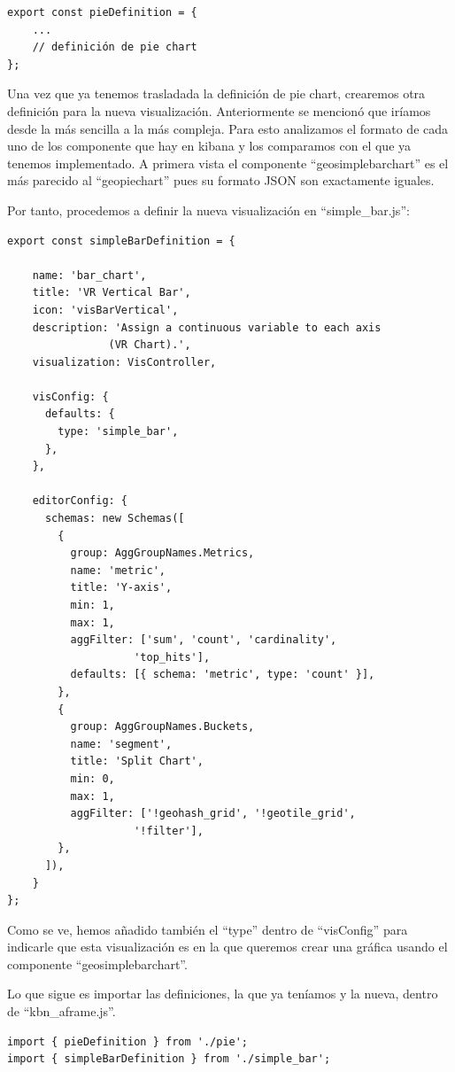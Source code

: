 \documentclass[a4paper, 12pt]{book}
\begin{document}
\begin{lstlisting}[frame=single]
export const pieDefinition = { 
    ...
    // definición de pie chart
};
\end{lstlisting}

Una vez que ya tenemos trasladada la definición de pie chart, crearemos otra definición para la nueva visualización. Anteriormente se mencionó que iríamos desde la más sencilla a la más compleja. Para esto analizamos el formato de cada uno de los componente que hay en kibana y los comparamos con el que ya tenemos implementado. A primera vista el componente “geosimplebarchart” es el más parecido al “geopiechart” pues su formato JSON son exactamente iguales.

Por tanto, procedemos a definir la nueva visualización en “simple\_bar.js”:

\begin{lstlisting}[frame=single]
export const simpleBarDefinition = {
    
    name: 'bar_chart',
    title: 'VR Vertical Bar',
    icon: 'visBarVertical',
    description: 'Assign a continuous variable to each axis 
                (VR Chart).',
    visualization: VisController,
    
    visConfig: {
      defaults: {
        type: 'simple_bar',
      },
    },
    
    editorConfig: {
      schemas: new Schemas([
        {
          group: AggGroupNames.Metrics,
          name: 'metric',
          title: 'Y-axis',
          min: 1,
          max: 1,
          aggFilter: ['sum', 'count', 'cardinality',
                    'top_hits'],
          defaults: [{ schema: 'metric', type: 'count' }],
        },
        {
          group: AggGroupNames.Buckets,
          name: 'segment',
          title: 'Split Chart',
          min: 0,
          max: 1,
          aggFilter: ['!geohash_grid', '!geotile_grid', 
                    '!filter'],
        },
      ]),
    }
};
\end{lstlisting}

Como se ve, hemos añadido también el “type” dentro de “visConfig” para indicarle que esta visualización es en la que queremos crear una gráfica usando el componente “geosimplebarchart”.

Lo que sigue es importar las definiciones, la que ya teníamos y la nueva, dentro de “kbn\_aframe.js”.


\begin{lstlisting}[frame=single]
import { pieDefinition } from './pie';
import { simpleBarDefinition } from './simple_bar';
\end{lstlisting}
\end{document}
